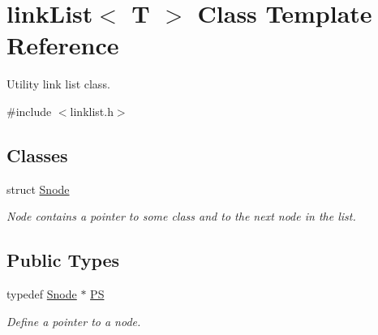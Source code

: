 \hypertarget{classlink_list}{
\section{linkList$<$ T $>$ Class Template Reference}
\label{classlink_list}
}


Utility link list class.  


{\ttfamily \#include $<$linklist.h$>$}\subsection*{Classes}
\begin{DoxyCompactItemize}
\item 
struct \hyperlink{structlink_list_1_1_snode}{Snode}
\begin{DoxyCompactList}\small\item\em Node contains a pointer to some class and to the next node in the list. \item\end{DoxyCompactList}\end{DoxyCompactItemize}
\subsection*{Public Types}
\begin{DoxyCompactItemize}
\item 
typedef \hyperlink{structlink_list_1_1_snode}{Snode} $\ast$ \hyperlink{classlink_list_a03208c95c5a7c4e6d620673a45fdd75b}{PS}
\begin{DoxyCompactList}\small\item\em Define a pointer to a node. \item\end{DoxyCompactList}\end{DoxyCompactItemize}

